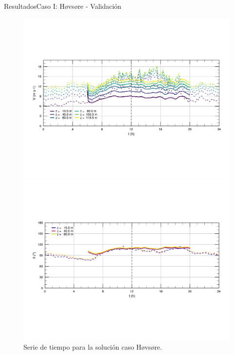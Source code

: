 \documentclass[mathserif,10pt]{beamer}
\begin{document}
\begin{frame}{Resultados}{Caso I: Høvsøre - Validación}
	\begin{figure}[H]
		\centering
		\includegraphics[width=0.85\linewidth,trim={9mm 63mm 10mm 55mm},clip]{fig/06/hov/ts_v}%
		
		\includegraphics[width=0.85\linewidth,trim={12mm 55mm 10mm 55mm},clip]{fig/06/hov/ts_o}%
		\vspace{-4mm}
		\caption{Serie de tiempo para la solución caso Høvsøre.}
		\label{fig:06_hov_ts}
	\end{figure}
\end{frame}
\end{document}
